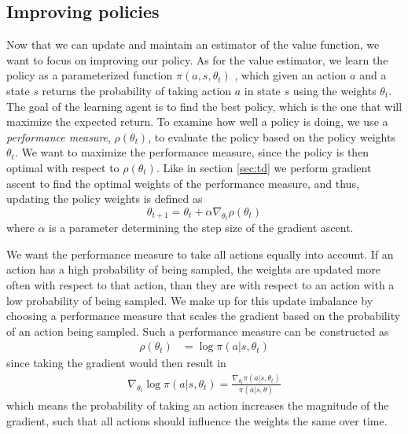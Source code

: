 \documentclass[11pt]{article}
\begin{document}
\subsection{Improving policies}
\label{sec:improv}
Now that we can update and maintain an estimator of the value function, we want
to focus on improving our policy.
As for the value estimator, we learn the policy as a parameterized function $\pi(a, s, \theta_t)$
, which given an action $a$ and a state $s$ returns the probability
of taking action $a$ in state $s$ using the weights $\theta_t$.
The goal of the learning agent is to find the best policy, which is the one 
that will maximize the expected return.
To examine how well a policy is doing, we use a \textit{performance measure}, $\rho(\theta_t)$, to evaluate
the policy based on the policy weights $\theta_t$.
We want to maximize the performance measure, since the policy is then optimal with
respect to $\rho(\theta_t)$.
Like in section \ref{sec:td}
we perform gradient ascent to find the optimal weights of the performance measure,
and thus, updating the policy weights is defined as
\begin{equation}
    \theta_{t+1} = \theta_t + \alpha \nabla_{\theta_t} \rho(\theta_t)
\end{equation}
where $\alpha$ is a parameter determining the step size of the gradient ascent.

We want the performance measure to take all actions equally into account.
If an action has a high probability of being sampled, the weights are
updated more often with respect to that action, than they are with respect to an
action with a low probability of being sampled.
We make up for this update imbalance by choosing a performance measure
that scales the gradient based on the probability of an action being sampled.
Such a performance measure can be constructed as
\begin{equation}
    \begin{aligned}
        \rho(\theta_t) & = \log\pi(a|s, \theta_t)
    \end{aligned}
\end{equation}
since taking the gradient would then result in
\begin{equation}\label{per_mes}
    \begin{aligned}
        \nabla_{\theta_t} \log\pi(a|s, \theta_t) = \frac{\nabla_{\theta_t}\pi(a|s, \theta_t)}{\pi(a|s,\theta)}
    \end{aligned}
\end{equation}
which means the probability of taking an action increases the magnitude of the gradient,
such that all actions should influence the weights the same over time.
\end{document}
